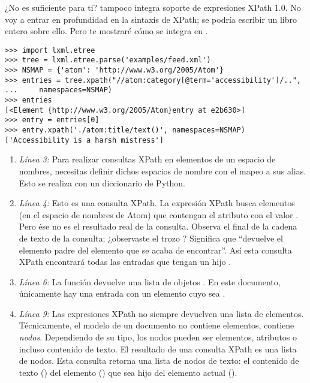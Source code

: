 ¿No es suficiente para ti?  tampoco integra soporte de expresiones XPath 1.0. No voy a entrar en profundidad en la sintaxis de XPath; se podría escribir un libro entero sobre ello. Pero te mostraré cómo se integra en .

\noindent\begin{minipage}{\textwidth}
\begin{lstlisting}[mathescape=True]
>>> import lxml.etree
>>> tree = lxml.etree.parse('examples/feed.xml')
>>> NSMAP = {'atom': 'http://www.w3.org/2005/Atom'}
>>> entries = tree.xpath("//atom:category[@term='accessibility']/..",
...     namespaces=NSMAP)
>>> entries 
[<Element {http://www.w3.org/2005/Atom}entry at e2b630>]
>>> entry = entries[0]
>>> entry.xpath('./atom:title/text()', namespaces=NSMAP)
['Accessibility is a harsh mistress']
\end{lstlisting}
\end{minipage}

\begin{enumerate}

\item \emph{Línea 3:} Para realizar consultas XPath en elementos de un espacio de nombres, necesitas definir dichos espacios de nombre con el mapeo a sus alias. Esto se realiza con un diccionario de Python.

\item \emph{Línea 4:} Esto es una consulta XPath. La expresión XPath busca elementos  (en el espacio de nombres de Atom) que contengan el atributo  con el valor . Pero ése no es el resultado real de la consulta. Observa el final de la cadena de texto de la consulta; ¿observaste el trozo ? Significa que ``devuelve el elemento padre del elemento  que se acaba de encontrar''. Así esta consulta XPath encontrará todas las entradas que tengan un hijo .

\item \emph{Línea 6:} La función  devuelve una lista de objetos . En este documento, únicamente hay una entrada con un elemento  cuyo  sea .

\item \emph{Línea 9:} Las expresiones XPath no siempre devuelven una lista de elementos. Técnicamente, el modelo  de un documento  no contiene elementos, contiene \emph{nodos}. Dependiendo de su tipo, los nodos pueden ser elementos, atributos o incluso contenido de texto. El resultado de una consulta XPath es una lista de nodos. Esta consulta retorna una lista de nodos de texto: el contenido de texto () del elemento  () que sea hijo del elemento actual ().

\end{enumerate}

